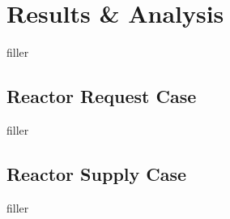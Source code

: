 \section{Results \& Analysis}

filler

\subsection{Reactor Request Case}

filler

\subsection{Reactor Supply Case}

filler
